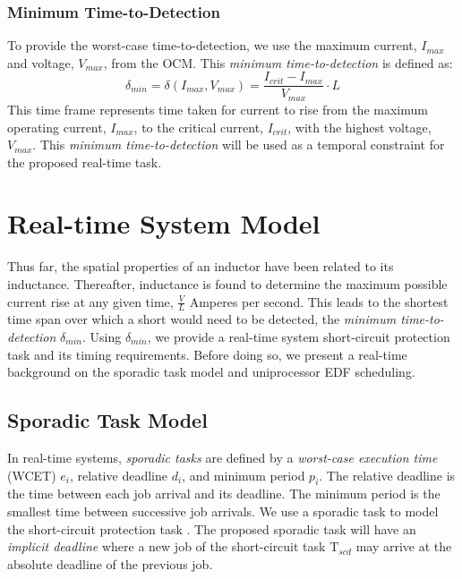 \documentclass[11pt,compsoc,oneside]{report}
\begin{document}
\subsection{Minimum Time-to-Detection}
To provide the worst-case time-to-detection, we use the maximum current, $I_{max}$ and voltage, $V_{max}$, from the OCM. This \textit{minimum time-to-detection} is defined as:
\begin{equation}\label{eq:MinTimeToDetect}
\delta_{min} = \delta(I_{max},V_{max}) = \frac{I_{crit}-I_{max}}{V_{max}}\cdot L
\end{equation}
This time frame represents time taken for current to rise from the maximum operating current, $I_{max}$, to the critical current, $I_{crit}$, with the highest voltage, $V_{max}$. This \textit{minimum time-to-detection} will be used as a temporal constraint for the proposed real-time task.
\chapter{Real-time System Model}\label{chap:real-time system model}
Thus far, the spatial properties of an inductor have been related to its inductance. Thereafter, inductance is found to determine the maximum possible current rise at any given time, $\frac{V}{L}$ Amperes per second. This leads to the shortest time span over which a short would need to be detected, the \textit{minimum time-to-detection} $\delta_{min}$. Using $\delta_{min}$, we provide a real-time system short-circuit protection task and its timing requirements. Before doing so, we present a real-time background on the sporadic task model and uniprocessor EDF scheduling.

\section{Sporadic Task Model}
In real-time systems, \textit{sporadic tasks} are defined by a \textit{worst-case execution time} (WCET) $e_{i}$, relative deadline $d_{i}$, and minimum period $p_{i}$. The relative deadline is the time between each job arrival and its deadline. The minimum period is the smallest time between successive job arrivals. We use a sporadic task to model the short-circuit protection task \cite{sporadicTaskModel}. The proposed sporadic task will have an \textit{implicit deadline} where a new job of the short-circuit task $\mathrm{T}_{scd}$ may arrive at the absolute deadline of the previous job.
\end{document}
